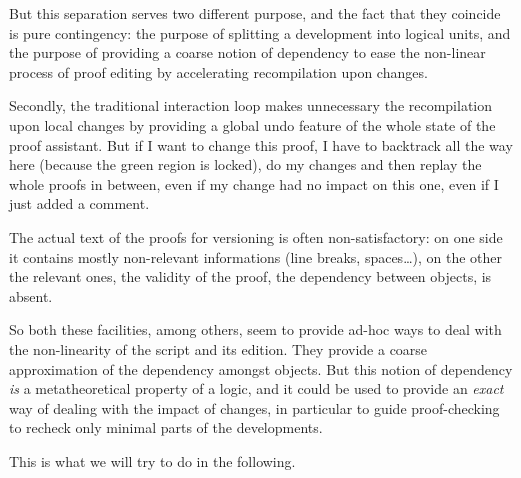 \documentclass[12pt]{article} \usepackage{beamerarticle} \usepackage{fullpage}
\begin{document}
But this separation serves two different purpose, and the fact that
they coincide is pure contingency: the purpose of splitting a
development into logical units, and the purpose of providing a coarse
notion of dependency to ease the non-linear process of proof editing
by accelerating recompilation upon changes.

Secondly, the traditional interaction loop makes unnecessary the
recompilation upon local changes by providing a global undo feature of
the whole state of the proof assistant. But if I want to change this
proof, I have to backtrack all the way here (because the green region
is locked), do my changes and then replay the whole proofs in between,
even if my change had no impact on this one, even if I just added a
comment.

The actual text of the proofs for versioning is often
non-satisfactory: on one side it contains mostly non-relevant
informations (line breaks, spaces\ldots), on the other the relevant
ones, the validity of the proof, the dependency between objects, is
absent.

So both these facilities, among others, seem to provide ad-hoc ways to
deal with the non-linearity of the script and its edition. They
provide a coarse approximation of the dependency amongst objects. But
this notion of dependency \emph{is} a metatheoretical property of a
logic, and it could be used to provide an \emph{exact} way of dealing
with the impact of changes, in particular to guide proof-checking to
recheck only minimal parts of the developments.

This is what we will try to do in the following.
\end{document}
